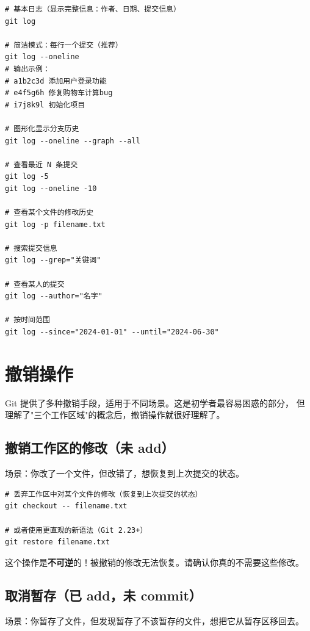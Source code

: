 \documentclass[12pt,a4paper,openany]{ctexbook}
\begin{document}
\begin{lstlisting}[style=shell]
# 基本日志（显示完整信息：作者、日期、提交信息）
git log

# 简洁模式：每行一个提交（推荐）
git log --oneline
# 输出示例：
# a1b2c3d 添加用户登录功能
# e4f5g6h 修复购物车计算bug
# i7j8k9l 初始化项目

# 图形化显示分支历史
git log --oneline --graph --all

# 查看最近 N 条提交
git log -5
git log --oneline -10

# 查看某个文件的修改历史
git log -p filename.txt

# 搜索提交信息
git log --grep="关键词"

# 查看某人的提交
git log --author="名字"

# 按时间范围
git log --since="2024-01-01" --until="2024-06-30"
\end{lstlisting}

\section{撤销操作}

Git 提供了多种撤销手段，适用于不同场景。这是初学者最容易困惑的部分，
但理解了"三个工作区域"的概念后，撤销操作就很好理解了。

\subsection{撤销工作区的修改（未 add）}

场景：你改了一个文件，但改错了，想恢复到上次提交的状态。

\begin{lstlisting}[style=shell]
# 丢弃工作区中对某个文件的修改（恢复到上次提交的状态）
git checkout -- filename.txt

# 或者使用更直观的新语法（Git 2.23+）
git restore filename.txt
\end{lstlisting}

\begin{warnbox}
这个操作是\textbf{不可逆}的！被撤销的修改无法恢复。请确认你真的不需要这些修改。
\end{warnbox}

\subsection{取消暂存（已 add，未 commit）}

场景：你暂存了文件，但发现暂存了不该暂存的文件，想把它从暂存区移回去。
\end{document}
